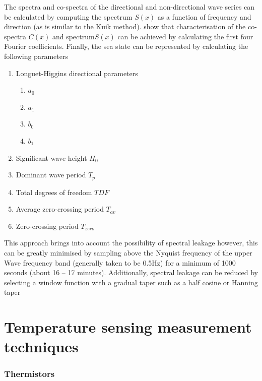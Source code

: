 The spectra and co-spectra of the directional and non-directional wave series can be calculated by computing the spectrum $S(x)$ as a function of frequency and direction (as is similar to the Kuik method). \textcite{earle1996nondirectional} show that characterisation of the co-spectra $C(x)$ and spectrum$S(x)$ can be achieved by calculating the first four Fourier coefficients. Finally, the sea state can be represented by calculating the following parameters

\begin{enumerate}
	\item Longuet-Higgins directional parameters
	\begin{enumerate}
		\item $a_0$
		\item $a_1$
		\item $b_0$
		\item $b_1$
	\end{enumerate}
	\item Significant wave height $H_0$
	\item Dominant wave period $T_p$
	\item Total degrees of freedom $TDF$
	\item Average zero-crossing period $T_{av}$
	\item Zero-crossing period $T_{zero}$
\end{enumerate}

This approach brings into account the possibility of spectral leakage however, this can be greatly minimised by sampling above the Nyquist frequency of the upper Wave frequency band (generally taken to be 0.5Hz) for a minimum of 1000 seconds (about 16 – 17 minutes). Additionally, spectral leakage can be reduced by selecting a window function with a gradual taper such as a half cosine or Hanning taper \cite{welch1967use}\par

\section{Temperature sensing measurement techniques}
\label{appendix:tempsense}
\subsubsection{Thermistors}

